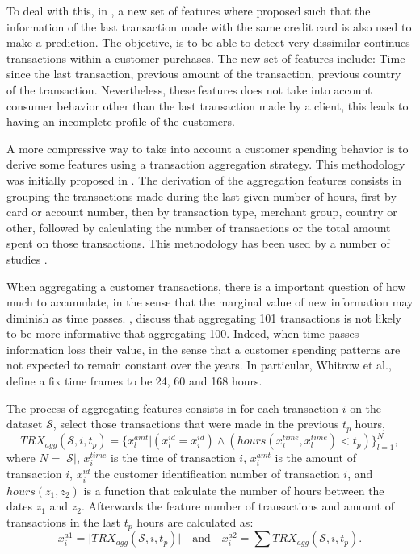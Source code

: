 	To deal with this, in \citep{Gadi2008}, a new set of features where proposed such that the 
	information of the last transaction made with the same credit card is also used to make a 
	prediction. The objective, is to be able to detect very dissimilar continues transactions within 
	a	customer purchases. The new set of features include: Time since the last transaction, previous 	
	amount of the transaction, previous country of the transaction.
	Nevertheless, these features does not take into account consumer behavior other than the last 
	transaction made by a client, this leads to having an incomplete profile of the customers.
	
	A more compressive way to take into account a customer spending behavior is to derive some 
	features using a transaction aggregation strategy. This methodology was initially proposed in 
	\citep{Whitrow2008}.  The derivation of the aggregation features consists in  grouping 
	the transactions made during the last given number of hours, first by card or account number, 
	then by transaction type, merchant group, country or other, followed by calculating the number 
	of transactions or the total amount spent on those 	transactions. This methodology has been used 
	by a number of studies 
	\citep{Bhattacharyya2011,Weston2008,Tasoulis2008,CorreaBahnsen2013,Sahin2013,CorreaBahnsen2014,
DalPozzolo2014}.
	
	When aggregating a customer transactions, there is a important question of how much to 
	accumulate, in the sense that the marginal value of new information may diminish as time passes.
	\citep{Whitrow2008}, discuss that aggregating 101 transactions is not likely to be
	more informative that aggregating 100. Indeed, when time passes information loss their value, in 
	the sense that a customer spending patterns are not expected to remain constant over the years.
	In particular, Whitrow et al., define a fix time frames to be 24, 60 and 168 hours.
	
	The process of aggregating features consists in for each transaction $i$ on the dataset 
	$\mathcal{S}$, select 	those transactions that were made in the previous $t_p$ hours,
	\begin{equation}\label{eq:agg_features1}
		TRX_{agg}(\mathcal{S},i, t_p) = \bigg\{x_l^{amt} \bigg\vert \left(x_l^{id}=x_i^{id}\right) 
		\wedge \left(hours(x_i^{time},x_l^{time}) < t_p\right) \bigg\}_{l=1}^N,
	\end{equation}
	where $N=\vert\mathcal{S}\vert$, $x_i^{time}$ is the time of transaction $i$,  $x_i^{amt}$ is the 
	amount of transaction $i$, $x_i^{id}$  the customer identification number of transaction $i$, 
	and $hours(z_1,z_2)$ is 	a function that calculate the number of hours between the dates $z_1$ 
	and $z_2$. Afterwards the feature number of transactions and amount of transactions in the last 
	$t_p$ hours are calculated as:
	\[
		x_i^{a1} = \vert TRX_{agg}(\mathcal{S},i, t_p) \vert \quad  \text{and} \quad x_i^{a2} = \sum 
	TRX_{agg}(\mathcal{S},i, t_p).
	\]
	

